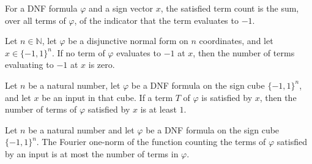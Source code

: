 \begin{definition}
\label{FABL.DNFFormula.satisfiedTermCount}
\leanok
{}
For a DNF formula $\varphi$ and a sign vector $x$, the satisfied term count is the sum,
over all terms of $\varphi$, of the indicator that the term evaluates to $-1$.
\end{definition}

\begin{theorem}
\label{FABL.DNFFormula.satisfiedTermCount_eq_zero_of_no_satisfied_term}
\leanok
{}
Let $n\in\mathbb N$, let $\varphi$ be a disjunctive normal form on $n$ coordinates, and
let $x\in\{-1,1\}^n$. If no term of $\varphi$ evaluates to $-1$ at $x$, then the number
of terms evaluating to $-1$ at $x$ is zero.
\end{theorem}

\begin{theorem}
\label{FABL.DNFFormula.one_le_satisfiedTermCount_of_satisfied_term}
\leanok
{}
Let $n$ be a natural number, let $\varphi$ be a DNF formula on the sign cube
$\{-1,1\}^n$, and let $x$ be an input in that cube. If a term $T$ of $\varphi$ is
satisfied by $x$, then the number of terms of $\varphi$ satisfied by $x$ is at least
$1$.
\end{theorem}

\begin{theorem}
\label{FABL.DNFFormula.fourierOneNorm_satisfiedTermCount_le}
\leanok
{}
Let $n$ be a natural number and let $\varphi$ be a DNF formula on the sign cube
$\{-1,1\}^n$. The Fourier one-norm of the function counting the terms of $\varphi$
satisfied by an input is at most the number of terms in $\varphi$.
\end{theorem}

